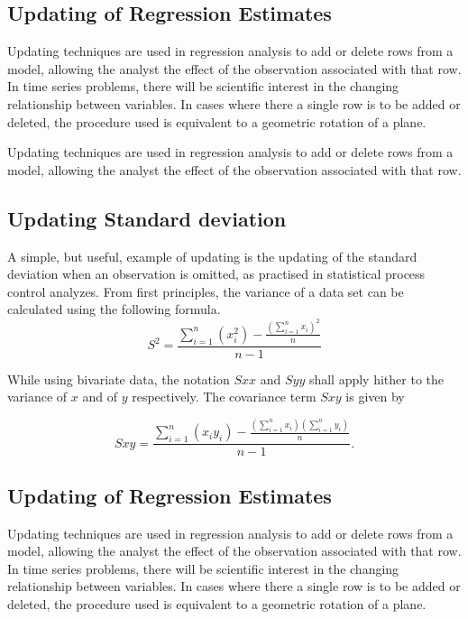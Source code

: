 \subsection{Updating of Regression Estimates}
Updating techniques are used in regression analysis to add or delete rows from a model, allowing the analyst the effect of the observation associated with that row. In time series problems, there will be scientific interest in the changing relationship between variables. In cases where there a single row is to be added or deleted, the procedure used is equivalent to a geometric rotation of a plane.

Updating techniques are used in regression analysis to add or delete rows from a model, allowing the analyst the effect of the observation associated with that row.

\subsection{Updating Standard deviation}
A simple, but useful, example of updating is the updating of the standard deviation when an observation is omitted, as practised in statistical process control analyzes. From first principles, the variance of a data set can be calculated using the following formula.
\begin{equation}
S^{2}=\frac{\sum_{i=1}^{n}(x_{i}^{2})-\frac{(\sum_{i=1}^{n}x_{i})^{2}}{n}}{n-1}
\end{equation}

While using bivariate data, the notation $Sxx$ and $Syy$ shall apply hither to the variance of $x$ and of $y$ respectively. The covariance term $Sxy$ is given by

\begin{equation}
Sxy=\frac{\sum_{i=1}^{n}(x_{i}y_{i})-\frac{(\sum_{i=1}^{n}x_{i})(\sum_{i=1}^{n}y_{i})}{n}}{n-1}.
\end{equation}

\subsection{Updating of Regression Estimates}
Updating techniques are used in regression analysis to add or
delete rows from a model, allowing the analyst the effect of the
observation associated with that row. In time series problems,
there will be scientific interest in the changing relationship
between variables. In cases where there a single row is to be
added or deleted, the procedure used is equivalent to a geometric
rotation of a plane.

